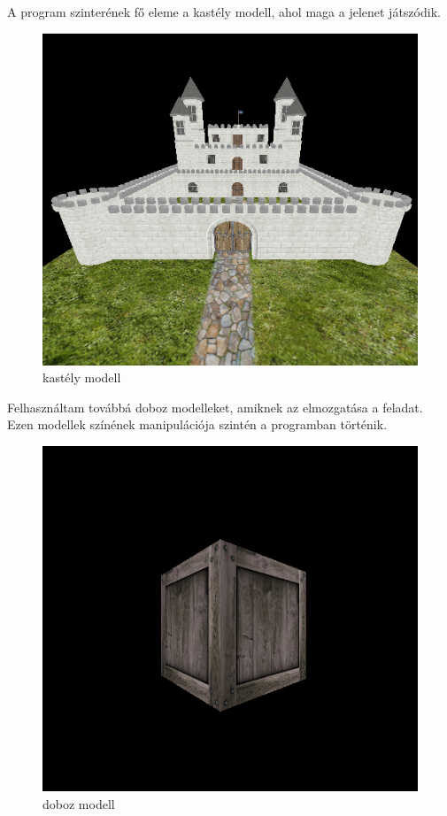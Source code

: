 A program szinterének fő eleme a kastély modell, ahol maga a jelenet játszódik.
\begin{figure}[htp]
    \centering
   	\includegraphics[width=4truecm, height=3truecm]{images/castle.png}
	\caption{kastély modell}
\end{figure}

Felhasználtam továbbá doboz modelleket, amiknek az elmozgatása a feladat. Ezen modellek színének manipulációja szintén a programban történik.
\begin{figure}[htp]
    \centering
   	\includegraphics[width=4truecm, height=3truecm]{images/box.png}
	\caption{doboz modell}
\end{figure}

